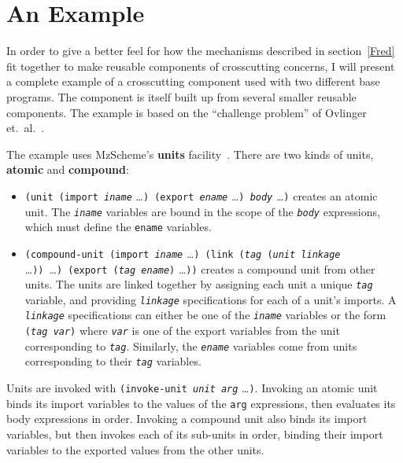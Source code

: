 \documentclass{article}
\newcommand{\defn}[1]{\textbf{#1}}
\newcommand{\code}[1]{\texttt{#1}}
\newcommand{\parm}[1]{\code{\textit{#1}}}
\begin{document}
\section{An Example}
\label{example}

In order to give a better feel for how the mechanisms described in
section~\ref{Fred} fit together to make reusable components of
crosscutting concerns, I will present a complete example of a
crosscutting component used with two different base programs.  The
component is itself built up from several smaller reusable components.
The example is based on the ``challenge problem'' of Ovlinger
et.~al.~\cite{acc}.

The example uses MzScheme's \defn{units} facility~\cite{units}.  There
are two kinds of units, \defn{atomic} and \defn{compound}:

\begin{itemize}
\item \code{(unit (import \parm{iname}} \ldots\code{)\ (export
      \parm{ename}} \ldots\code{)\ \parm{body}} \ldots\code{)}
      creates an atomic unit.  The \parm{iname} variables are bound in
      the scope of the \parm{body} expressions, which must define the
      \code{ename} variables.
\item \code{(compound-unit (import \parm{iname}} \ldots\code{)\ (link
      (\parm{tag} (\parm{unit} \parm{linkage}} \ldots\code{))}\ 
      \ldots\code{)\ (export (\parm{tag} \parm{ename})} \ldots\code{))}
      creates a compound unit from other units.  The units are linked
      together by assigning each unit a unique \parm{tag} variable,
      and providing \parm{linkage} specifications for each of a unit's
      imports.  A \parm{linkage} specifications can either be one of the
      \parm{iname} variables or the form \code{(\parm{tag}
      \parm{var})} where \parm{var} is one of the export variables
      from the unit corresponding to \parm{tag}.  Similarly, the
      \parm{ename} variables come from units corresponding to their
      \parm{tag} variables.
\end{itemize}

Units are invoked with \code{(invoke-unit \parm{unit} \parm{arg}}
\ldots\code{)}.  Invoking an atomic unit binds its import variables to
the values of the \code{arg} expressions, then evaluates its body
expressions in order.  Invoking a compound unit also binds its import
variables, but then invokes each of its sub-units in order, binding
their import variables to the exported values from the other units.
\end{document}
